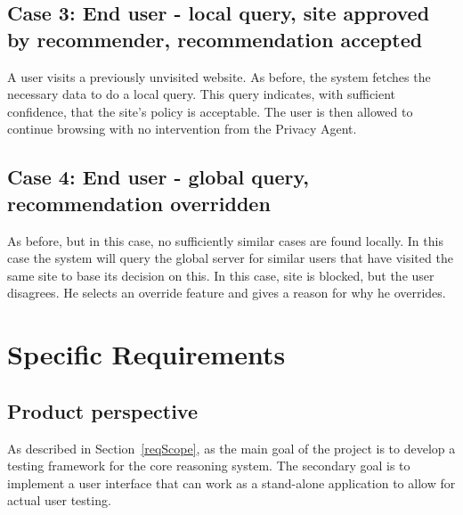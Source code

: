 \subsection*{Case 3: End user - local query, site approved by recommender, recommendation accepted}
A user visits a previously unvisited website. As before, the system fetches the necessary data to do a local query. This query indicates, with sufficient confidence, that the site's policy is acceptable. The user is then allowed to continue browsing with no intervention from the Privacy Agent.

\subsection*{Case 4: End user - global query, recommendation overridden}
As before, but in this case, no sufficiently similar cases are found locally. In this case the system will query the global server for similar users that have visited the same site to base its decision on this. In this case, site is blocked, but the user disagrees. He selects an override feature and gives a reason for why he overrides.

\section{Specific Requirements}\label{specRec}

\subsection{Product perspective}
As described in Section~\ref{reqScope}, as the main goal of the project is to develop a testing framework for the core reasoning system. The secondary goal is to implement a user interface that can work as a stand-alone application to allow for actual user testing.

